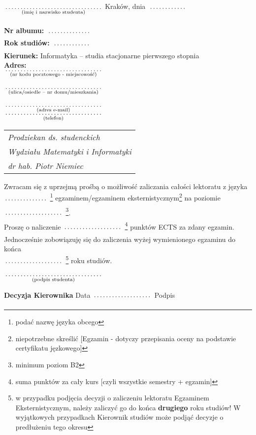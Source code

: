 \documentclass[a4paper,11pt]{article}
\newcommand{\fillField}[2]{
    $\underset{\text{#1}}{\parbox[t]{#2}{\dotfill}}$
}
\begin{document}
\noindent
\fillField{(imię i nazwisko studenta)}{5cm} \hfill Kraków, dnia \fillField{}{2cm} \\\\
\textbf{Nr albumu:}   \fillField{}{2.3cm}\\
\textbf{Rok studiów:} \fillField{}{2cm}\\
\textbf{Kierunek:} Informatyka -- studia stacjonarne pierwszego stopnia\\
\textbf{Adres:}\\
\fillField{(nr kodu pocztowego - miejscowość)}{5cm}\\\\
\fillField{(ulica/osiedle – nr domu/mieszkania)}{5cm}\\\\
\fillField{(adres e-mail)}{5cm}\\
\fillField{(telefon)}{5cm}
\phantom{a}\hfill
\begin{tabular}[c]{@{}l@{}}
\textit{Prodziekan ds. studenckich} \\
\textit{Wydziału Matematyki i Informatyki}\\
\textit{dr hab. Piotr Niemiec}
\end{tabular}

\vskip 2.0cm


Zwracam się z uprzejmą prośbą o możliwość zaliczania całości
lektoratu z języka \\
\fillField{}{2.2cm}\footnote{podać nazwę języka obcego}
egzaminem/egzaminem eksternistycznym\footnote{niepotrzebne skreślić [Egzamin - dotyczy przepisania oceny na podstawie certyfikatu jęzkowego]}
na poziomie \fillField{}{3cm}\footnote{minimum poziom B2}. \\

\noindent
Proszę o naliczenie\fillField{}{3cm}\footnote{suma punktów za cały kurs [czyli wszystkie semestry + egzamin]} punktów ECTS za zdany egzamin.\\

\noindent
Jednocześnie zobowiązuję się do zaliczenia wyżej wymienionego egzaminu do końca\\\fillField{}{3cm}\footnote{w przypadku podjęcia decyzji o zaliczeniu lektoratu Egzaminem Eksternistycznym, należy zaliczyć go do końca \textbf{drugiego} roku studiów! W wyjątkowych przypadkach Kierownik studiów może podjąć decyzje o predłużeniu tego okresu} roku studiów.

\vskip 1cm

\hspace{\fill} \fillField{(podpis studenta)}{5cm} \hspace{2.0cm}
\vskip 3.0cm

\noindent
\textbf{Decyzja Kierownika} \dotfill
\vskip 0.5cm
\noindent
Data \fillField{}{3cm} Podpis \dotfill
\end{document}

